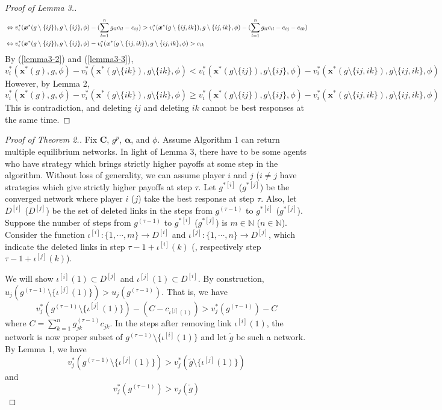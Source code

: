 \documentclass[12pt]{article}
\theoremstyle{definition}
\begin{document}
\begin{proof}[Proof of Lemma 3.]
\begin{align}
			& \Leftrightarrow v_i^*(\bm{x}^*(g \setminus \{ij\}), g \setminus \{ij\}, \phi) - (\sum_{l=1}^n g_{il} c_{il} - c_{ij}) > v_i^*(\bm{x}^*(g \setminus \{ij,ik\}), g \setminus \{ij,ik\}, \phi) - (\sum_{l=1}^n g_{il} c_{il} - c_{ij} - c_{ik}) \notag \\
			& \Leftrightarrow v_i^*(\bm{x}^*(g \setminus \{ij\}), g \setminus \{ij\}, \phi) - v_i^*(\bm{x}^*(g \setminus \{ij,ik\}), g \setminus \{ij,ik\}, \phi) > c_{ik}
	\end{align}
	By (\ref{lemma3-2}) and (\ref{lemma3-3}),
	\[ v_i^*(\bm{x}^*(g), g, \phi) - v_i^*(\bm{x}^*(g \setminus \{ik\}), g \setminus \{ik\}, \phi) < v_i^*(\bm{x}^*(g \setminus \{ij\}), g \setminus \{ij\}, \phi) - v_i^*(\bm{x}^*(g \setminus \{ij,ik\}), g \setminus \{ij,ik\}, \phi) \]
	However, by Lemma 2,
	\[ v_i^*(\bm{x}^*(g), g, \phi) - v_i^*(\bm{x}^*(g \setminus \{ik\}), g \setminus \{ik\}, \phi) \ge v_i^*(\bm{x}^*(g \setminus \{ij\}), g \setminus \{ij\}, \phi) - v_i^*(\bm{x}^*(g \setminus \{ij,ik\}), g \setminus \{ij,ik\}, \phi) \]
	This is contradiction, and deleting $ij$ and deleting $ik$ cannot be best responses at the same time.
\end{proof}

\begin{proof}[Proof of Theorem 2.]
	Fix $\bm{C}$, $g^p$, $\bm{\alpha}$, and $\phi$.
	Assume Algorithm 1 can return multiple equilibrium networks.
	In light of Lemma 3, there have to be some agents who have strategy which brings strictly higher payoffs at some step in the algorithm.
	Without loss of generality, we can assume player $i$ and $j$ ($i \neq j$ have strategies which give strictly higher payoffs at step $\tau$.
	Let $g^{* [i]}$ ($g^{* [j]}$) be the converged network where player $i$ ($j$) take the best response at step $\tau$.
	Also, let $D^{[i]}$ ($D^{[j]}$) be the set of deleted links in the steps from $g^{(\tau-1)}$ to $g^{* [i]}$ ($g^{* [j]}$).
	Suppose the number of steps from $g^{(\tau-1)}$ to $g^{* [i]}$ ($g^{* [j]}$) is $m \in \mathbb{N}$ ($n \in \mathbb{N}$).
	Consider the function $\iota^{[i]} : \{1, \cdots, m\} \rightarrow D^{[i]}$ and $\iota^{[j]} : \{1, \cdots, n\} \rightarrow D^{[j]}$, which indicate the deleted links in step $\tau - 1 + \iota^{[i]}(k)$ (, respectively step $\tau - 1 + \iota^{[j]}(k)$).

	We will show $\iota^{[i]}(1) \subset D^{[j]}$ and $\iota^{[j]}(1) \subset D^{[i]}$.
	By construction, $u_j(g^{(\tau-1)} \setminus \{ \iota^{[j]}(1) \}) > u_j(g^{(\tau-1)})$.
	That is, we have
	\[ v_j^*(g^{(\tau-1)} \setminus \{ \iota^{[j]}(1) \}) - (C - c_{\iota^{[j]}(1)}) > v_j^*(g^{(\tau-1)}) - C \]
	where $C = \sum_{k=1}^n g^{(\tau-1)}_{jk} c_{jk}$.
	In the steps after removing link $\iota^{[i]}(1)$, the network is now proper subset of $g^{(\tau-1)} \setminus \{\iota^{[i]}(1)\}$ and let $\tilde{g}$ be such a network.
	By Lemma 1, we have
	\[ v_j^*(g^{(\tau-1)} \setminus \{ \iota^{[j]}(1) \}) > v_j^*(\tilde{g} \setminus \{ \iota^{[j]}(1) \}) \]
	and
	\[ v_j^*(g^{(\tau-1)}) > v_j(\tilde{g})\]
\end{proof}
\end{document}
